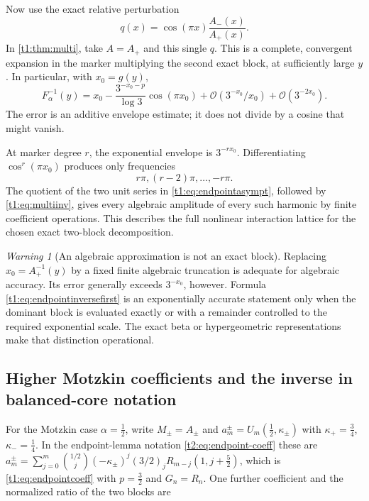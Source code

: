 \documentclass[11pt,openany]{book}
\numberwithin{equation}{chapter}
\theoremstyle{plain}
\theoremstyle{definition}
\theoremstyle{remark}
\newtheorem{warning}[theorem]{Warning}
\newcommand{\OO}{\mathcal O}\newcommand{\bigO}{\mathcal O}
\newcommand{\rising}[2]{(#1)_{#2}}
\begin{document}
Now use the exact relative perturbation
\begin{equation}
 q(x)=\cos(\pi x)\frac{A_-(x)}{A_+(x)}.
 \label{t1:eq:endpointq}
\end{equation}
In \cref{t1:thm:multi}, take $A=A_+$ and this single $q$. This is a complete, convergent expansion in the marker multiplying the second exact block, at sufficiently large $y$. In particular, with $x_0=g(y)$,
\begin{equation}
 F_\alpha^{-1}(y)=x_0-
 \frac{3^{-x_0-p}}{\log3}\cos(\pi x_0)
 +\OO(3^{-x_0}/x_0)+\OO(3^{-2x_0}).
 \label{t1:eq:endpointinversefirst}
\end{equation}
The error is an additive envelope estimate; it does not divide by a cosine that might vanish.

At marker degree $r$, the exponential envelope is $3^{-rx_0}$. Differentiating $\cos^r(\pi x_0)$ produces only frequencies
\[
 r\pi,(r-2)\pi,\ldots,-r\pi.
\]
The quotient of the two unit series in \eqref{t1:eq:endpointasympt}, followed by \eqref{t1:eq:multiinv}, gives every algebraic amplitude of every such harmonic by finite coefficient operations. This describes the full nonlinear interaction lattice for the chosen exact two-block decomposition.

\begin{warning}[An algebraic approximation is not an exact block]
Replacing $x_0=A_+^{-1}(y)$ by a fixed finite algebraic truncation is adequate for algebraic accuracy. Its error generally exceeds $3^{-x_0}$, however. Formula \eqref{t1:eq:endpointinversefirst} is an exponentially accurate statement only when the dominant block is evaluated exactly or with a remainder controlled to the required exponential scale. The exact beta or hypergeometric representations make that distinction operational.
\end{warning}

\subsection{Higher Motzkin coefficients and the inverse in balanced-core notation}
\label{ct:sec:motzkin-extra}

For the Motzkin case $\alpha=\tfrac12$, write $M_\pm=A_\pm$ and
$a^\pm_m=U_m(\tfrac12,\kappa_\pm)$ with $\kappa_+=\tfrac34$, $\kappa_-=\tfrac14$.
In the endpoint-lemma notation \cref{t2:eq:endpoint-coeff} these are
$a^\pm_m=\sum_{j=0}^m\binom{1/2}{j}(-\kappa_\pm)^j\rising{3/2}{j}R_{m-j}(1,j+\tfrac52)$,
which is \cref{t1:eq:endpointcoeff} with $p=\tfrac32$ and $G_n=R_n$.  One
further coefficient and the normalized ratio of the two blocks are
\end{document}
